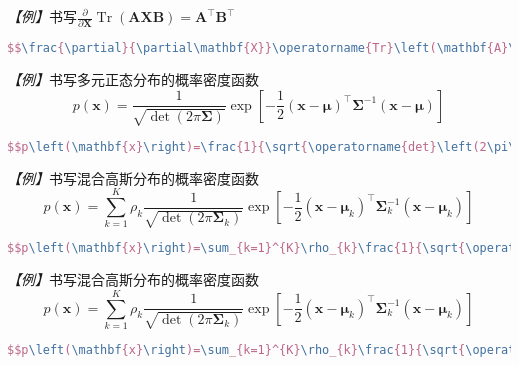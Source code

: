 \emph{【例】}书写$\frac{\partial}{\partial\mathbf{X}}\operatorname{Tr}\left(\mathbf{A}\mathbf{X}\mathbf{B}\right)=\mathbf{A}^{\top}\mathbf{B}^{\top}$
\begin{lstlisting}[language=TeX]
    $$\frac{\partial}{\partial\mathbf{X}}\operatorname{Tr}\left(\mathbf{A}\mathbf{X}\mathbf{B}\right)=\mathbf{A}^{\top}\mathbf{B}^{\top}$$
\end{lstlisting}

\emph{【例】}书写多元正态分布的概率密度函数
$$p\left(\mathbf{x}\right)=\frac{1}{\sqrt{\operatorname{det}\left(2\pi\mathbf{\Sigma}\right)}}\exp\left[-\frac{1}{2}\left(\mathbf{x}-\mathbf{\mu}\right)^{\top}\mathbf{\Sigma}^{-1}\left(\mathbf{x}-\mathbf{\mu}\right)\right]$$
\begin{lstlisting}[language=TeX]
    $$p\left(\mathbf{x}\right)=\frac{1}{\sqrt{\operatorname{det}\left(2\pi\mathbf{\Sigma}\right)}}\exp\left[-\frac{1}{2}\left(\mathbf{x}-\mathbf{\mu}\right)^{\top}\mathbf{\Sigma}^{-1}\left(\mathbf{x}-\mathbf{\mu}\right)\right]$$
\end{lstlisting}

\emph{【例】}书写混合高斯分布的概率密度函数
$$p\left(\mathbf{x}\right)=\sum_{k=1}^{K}\rho_{k}\frac{1}{\sqrt{\operatorname{det}\left(2\pi\mathbf{\Sigma}_{k}\right)}}\exp\left[-\frac{1}{2}\left(\mathbf{x}-\mathbf{\mu}_{k}\right)^{\top}\mathbf{\Sigma}_{k}^{-1}\left(\mathbf{x}-\mathbf{\mu}_{k}\right)\right]$$
\begin{lstlisting}[language=TeX]
    $$p\left(\mathbf{x}\right)=\sum_{k=1}^{K}\rho_{k}\frac{1}{\sqrt{\operatorname{det}\left(2\pi\mathbf{\Sigma}_{k}\right)}}\exp\left[-\frac{1}{2}\left(\mathbf{x}-\mathbf{\mu}_{k}\right)^{\top}\mathbf{\Sigma}_{k}^{-1}\left(\mathbf{x}-\mathbf{\mu}_{k}\right)\right]$$
\end{lstlisting}

\emph{【例】}书写混合高斯分布的概率密度函数
$$p\left(\mathbf{x}\right)=\sum_{k=1}^{K}\rho_{k}\frac{1}{\sqrt{\operatorname{det}\left(2\pi\mathbf{\Sigma}_{k}\right)}}\exp\left[-\frac{1}{2}\left(\mathbf{x}-\mathbf{\mu}_{k}\right)^{\top}\mathbf{\Sigma}_{k}^{-1}\left(\mathbf{x}-\mathbf{\mu}_{k}\right)\right]$$
\begin{lstlisting}[language=TeX]
    $$p\left(\mathbf{x}\right)=\sum_{k=1}^{K}\rho_{k}\frac{1}{\sqrt{\operatorname{det}\left(2\pi\mathbf{\Sigma}_{k}\right)}}\exp\left[-\frac{1}{2}\left(\mathbf{x}-\mathbf{\mu}_{k}\right)^{\top}\mathbf{\Sigma}_{k}^{-1}\left(\mathbf{x}-\mathbf{\mu}_{k}\right)\right]$$
\end{lstlisting}


